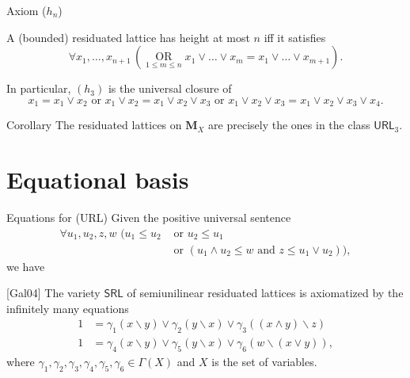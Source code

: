 \documentclass[professionalfont, 12pt]{beamer} %
\theoremstyle{plain}
\theoremstyle{definition}
\DeclareMathOperator*{\bigor}{OR}
\begin{document}
\begin{frame}{Axiom ($h_n$)}

    A (bounded) residuated lattice has height at most $n$ iff it satisfies
    \begin{equation}\tag{$h_n$}\label{axiom_of_finite_height}
            \forall x_1, \dots, x_{n+1} \, (\bigor \limits_{1 \leq m \leq n}
            x_1 \vee \dots \vee x_{m} = x_1 \vee \dots \vee x_{m+1}).
    \end{equation}

    In particular, $(h_3)$ is the universal closure of 
    $$x_1 = x_1 \vee x_2 \text{ or } x_1 \vee x_2 = x_1 \vee x_2 \vee x_3 \text{ or } x_1 \vee x_2 \vee x_3 = x_1 \vee x_2 \vee x_3 \vee x_4.$$

    \pause

    \begin{block}{Corollary}
        The residuated lattices on $\mathbf{M}_X$ are precisely the ones in the class $\mathsf{URL}_3$.
    \end{block}
\end{frame}

\section{Equational basis}

\begin{frame}{Equations for (URL)}
Given the positive universal sentence
\begin{align*}
    \forall u_1, u_2, z, w \, \, (u_1 \leq u_2 & \text{ or } u_2 \leq u_1\\
            & \text{ or } (u_1 \wedge u_2 \leq w \text{ and } z \leq u_1 \vee u_2)),
\end{align*}
we have

\begin{block}{[Gal04]}
    The variety $\mathsf{SRL}$ of semiunilinear residuated lattices is axiomatized by the infinitely many equations 
    \begin{align*}
        1 & = \gamma_1(x \backslash y) \vee \gamma_2(y \backslash x) \vee \gamma_3 ((x \wedge y) \backslash z)\\
        1 & = \gamma_4(x \backslash y) \vee \gamma_5(y \backslash x) \vee \gamma_6 (w \backslash (x \vee y)),
    \end{align*}
    where $ \gamma_1, \gamma_2, \gamma_3, \gamma_4, \gamma_5, \gamma_6 \in \Gamma(X)$ and $X$ is the set of variables.
\end{block}
\end{frame}
\end{document}
